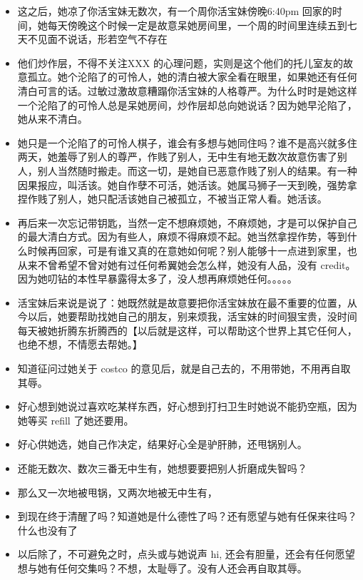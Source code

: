 \documentclass[9pt, b5paper]{article}
\begin{document}
\begin{itemize}
\item 这之后，她凉了你活宝妹无数次，有一个周你活宝妹傍晚6:40pm 回家的时间，她每天傍晚这个时候一定是故意呆她房间里，一个周的时间里连续五到七天不见面不说话，形若空气不存在
\item 他们炒作层，不得不关注XXX 的心理问题，实则是这个他们的托儿室友的故意孤立。她个沦陷了的可怜人，她的清白被大家全看在眼里，如果她还有任何清白可言的话。过敏过激故意糟蹋你活宝妹的人格尊严。为什么时时是她这样一个沦陷了的可怜人总是呆她房间，炒作层却总向她说话？因为她早沦陷了，她从来不清白。

\item 她只是一个沦陷了的可怜人棋子，谁会有多想与她同住吗？谁不是高兴就多住两天，她羞辱了别人的尊严，作贱了别人，无中生有地无数次故意伤害了别人，别人当然随时搬走。而这一切，是她自已恶意作贱了别人的结果。有一种因果报应，叫活该。她自作孽不可活，她活该。她属马狮子一天到晚，强势拿捏作贱了别人，她只配活该她自己被孤立，不被当正常人看。她活该。

\item 再后来一次忘记带钥匙，当然一定不想麻烦她，不麻烦她，才是可以保护自己的最大清白方式。因为有些人，麻烦不得麻烦不起。她当然拿捏作势，等到什么时候再回家，可是有谁又真的在意她如何呢？别人能够十一点进到家里，也从来不曾希望不曾对她有过任何希翼她会怎么样，她没有人品，没有 credit。因为她叨钻的本性早暴露得太多了，没人想再麻烦她任何。。。。。

\item 活宝妹后来说是说了：她既然就是故意要把你活宝妹放在最不重要的位置，从今以后，她要帮助找她自己的朋友，别来烦我，活宝妹的时间狠宝贵，没时间每天被她折腾东折腾西的【以后就是这样，可以帮助这个世界上其它任何人，也绝不想，不情愿去帮她。】

\item 知道征问过她关于 costco 的意见后，就是自己去的，不用带她，不用再自取其辱。

\item 好心想到她说过喜欢吃某样东西，好心想到打扫卫生时她说不能扔空瓶，因为她等买 refill 了她还要用。
\item 好心供她选，她自己作决定，结果好心全是驴肝肺，还甩锅别人。
\item 还能无数次、数次三番无中生有，她想要要把别人折磨成失智吗？
\item 那么又一次地被甩锅，又两次地被无中生有，
\item 到现在终于清醒了吗？知道她是什么德性了吗？还有愿望与她有任保来往吗？什么也没有了

\item 以后除了，不可避免之时，点头或与她说声 hi, 还会有胆量，还会有任何愿望想与她有任何交集吗？不想，太耻辱了。没有人还会再自取其辱。


\end{itemize}
\end{document}
